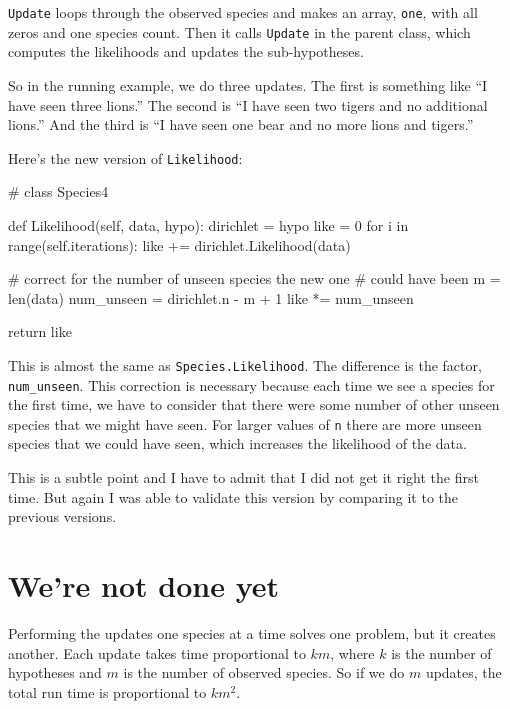\documentclass[12pt]{book}
\theoremstyle{exercise}
\newcommand{\py}[1]{{\tt #1}}%
\begin{document}
\py{Update} loops through the observed species and makes an
array, \py{one}, with all zeros and one species count.  Then
it calls \py{Update} in the parent class, which computes
the likelihoods and updates the sub-hypotheses.

So in the running example, we do three updates.  The first
is something like ``I have seen three lions.''  The second is
``I have seen two tigers and no additional lions.''  And the third
is ``I have seen one bear and no more lions and tigers.''

Here's the new version of \py{Likelihood}:

\begin{code}
# class Species4

    def Likelihood(self, data, hypo):
        dirichlet = hypo
        like = 0
        for i in range(self.iterations):
            like += dirichlet.Likelihood(data)

        # correct for the number of unseen species the new one
        # could have been
        m = len(data)
        num_unseen = dirichlet.n - m + 1
        like *= num_unseen

        return like
\end{code}

This is almost the same as \py{Species.Likelihood}.  The difference
is the factor, \verb"num_unseen".  This correction is necessary
because each time we see a species for the first time, we have to
consider that there were some number of other unseen species that
we might have seen.  For larger values of \py{n} there are more
unseen species that we could have seen, which increases the likelihood
of the data.

This is a subtle point and I have to admit that I did not get it right
the first time.  But again I was able to validate this version
by comparing it to the previous versions.


\section{We're not done yet}

\newcommand{\BigO}[1]{\mathcal{O}(#1)}

Performing the updates one species at a time solves one problem, but
it creates another.  Each update takes time proportional to $k m$,
where $k$ is the number of hypotheses and $m$ is the number of observed
species.  So if we do $m$ updates, the total run time is
proportional to $k m^2$.
\end{document}
